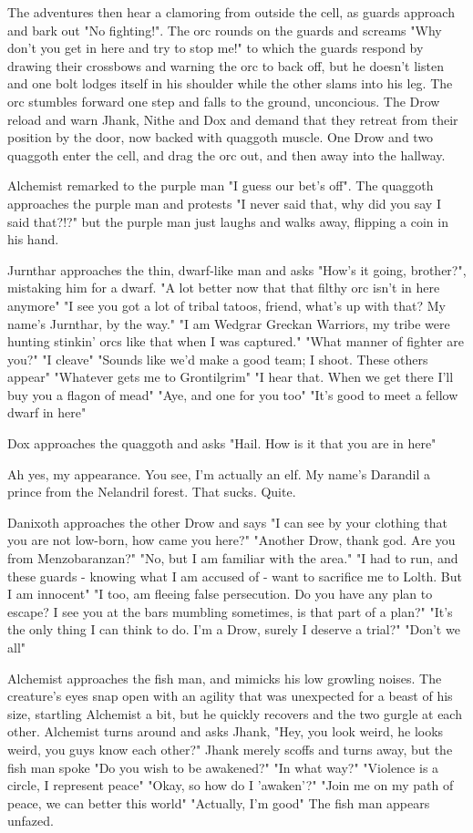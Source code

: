 \documentclass[letterpaper,10pt,twoside,twocolumn,openany]{book}
\begin{document}
The adventures then hear a clamoring from outside the cell, as guards approach and bark out "No fighting!". The orc rounds on the guards and screams "Why don't you get in here and try to stop me!" to which the guards respond by drawing their crossbows and warning the orc to back off, but he doesn't listen and one bolt lodges itself in his shoulder while the other slams into his leg. The orc stumbles forward one step and falls to the ground, unconcious. The Drow reload and warn Jhank, Nithe and Dox and demand that they retreat from their position by the door, now backed with quaggoth muscle. One Drow and two quaggoth enter the cell, and drag the orc out, and then away into the hallway.

Alchemist remarked to the purple man "I guess our bet's off". The quaggoth approaches the purple man and protests "I never said that, why did you say I said that?!?" but the purple man just laughs and walks away, flipping a coin in his hand.

Jurnthar approaches the thin, dwarf-like man and asks "How's it going, brother?", mistaking him for a dwarf. "A lot better now that that filthy orc isn't in here anymore"
"I see you got a lot of tribal tatoos, friend, what's up with that? My name's Jurnthar, by the way."
"I am Wedgrar Greckan Warriors, my tribe were hunting stinkin' orcs like that when I was captured."
"What manner of fighter are you?"
"I cleave"
"Sounds like we'd make a good team; I shoot. These others appear"
"Whatever gets me to Grontilgrim"
"I hear that. When we get there I'll buy you a flagon of mead"
"Aye, and one for you too"
"It's good to meet a fellow dwarf in here"

Dox approaches the quaggoth and asks "Hail. How is it that you are in here"

Ah yes, my appearance. You see, I'm actually an elf. My name's Darandil a prince from the Nelandril forest.
That sucks.
Quite.

Danixoth approaches the other Drow and says "I can see by your clothing that you are not low-born, how came you here?"
"Another Drow, thank god. Are you from Menzobaranzan?"
"No, but I am familiar with the area."
"I had to run, and these guards - knowing what I am accused of - want to sacrifice me to Lolth. But I am innocent"
"I too, am fleeing false persecution. Do you have any plan to escape? I see you at the bars mumbling sometimes, is that part of a plan?"
"It's the only thing I can think to do. I'm a Drow, surely I deserve a trial?"
"Don't we all"

Alchemist approaches the fish man, and mimicks his low growling noises. The creature's eyes snap open with an agility that was unexpected for a beast of his size, startling Alchemist a bit, but he quickly recovers and the two gurgle at each other. Alchemist turns around and asks Jhank, "Hey, you look weird, he looks weird, you guys know each other?" Jhank merely scoffs and turns away, but the fish man spoke "Do you wish to be awakened?"
"In what way?"
"Violence is a circle, I represent peace"
"Okay, so how do I 'awaken'?"
"Join me on my path of peace, we can better this world"
"Actually, I'm good"
The fish man appears unfazed.
\end{document}
